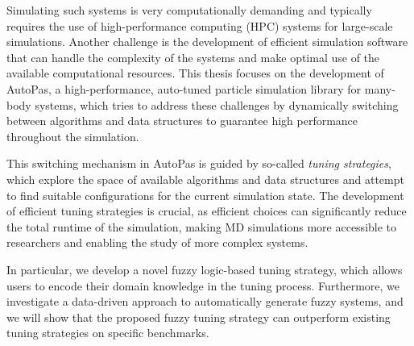 Simulating such systems is very computationally demanding and typically requires the use of high-performance computing (HPC) systems for large-scale simulations. Another challenge is the development of efficient simulation software that can handle the complexity of the systems and make optimal use of the available computational resources. This thesis focuses on the development of AutoPas, a high-performance, auto-tuned particle simulation library for many-body systems, which tries to address these challenges by dynamically switching between algorithms and data structures to guarantee high performance throughout the simulation.

This switching mechanism in AutoPas is guided by so-called \textit{tuning strategies}, which explore the space of available algorithms and data structures and attempt to find suitable configurations for the current simulation state. The development of efficient tuning strategies is crucial, as efficient choices can significantly reduce the total runtime of the simulation, making MD simulations more accessible to researchers and enabling the study of more complex systems.

In particular, we develop a novel fuzzy logic-based tuning strategy, which allows users to encode their domain knowledge in the tuning process. Furthermore, we investigate a data-driven approach to automatically generate fuzzy systems, and we will show that the proposed fuzzy tuning strategy can outperform existing tuning strategies on specific benchmarks.